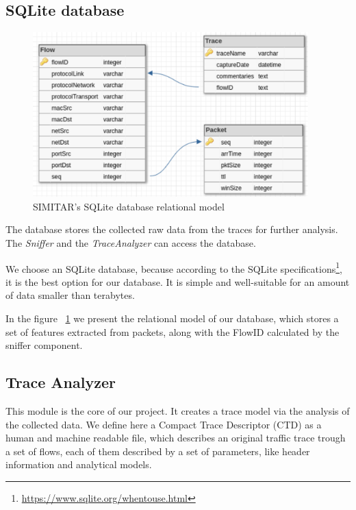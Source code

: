 \subsection{SQLite database}

\begin{figure}[ht!]
        \centering
        \includegraphics[height=2.5in]{figures/ch3/database-relational-model}
        \caption{SIMITAR's SQLite database relational model}
    \label{fig:simitar-database}
\end{figure}


The database stores the collected raw data  from the traces for further analysis. The \textit{Sniffer} and the \textit{TraceAnalyzer} can access the database. 


We choose an SQLite database, because according to the SQLite specifications\footnote{\href{https://www.sqlite.org/whentouse.html}{https://www.sqlite.org/whentouse.html}}, it is the best option for our database. It is simple and well-suitable for an amount of data smaller than terabytes.


In the figure ~\ref{fig:simitar-database} we present the relational model of our database, which stores a set of features extracted from packets, along with the FlowID calculated by the sniffer component. 

\subsection{Trace Analyzer}


This module is the core of our project. It creates a trace model via the analysis of the collected data. We define here a Compact Trace Descriptor (CTD) as a human and machine readable file, which describes an original traffic trace trough a set of flows, each of them described by a set of parameters, like header information and analytical models. 


